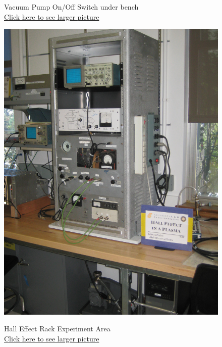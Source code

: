 \documentclass{../lab}
\begin{document}
\begin{figure}[!htb]
  \caption{Vacuum Pump On/Off Switch under bench \\ \href{http://experimentationlab.berkeley.edu/sites/default/files/images/Pump_Switch_3535-Lg.jpg}{Click here to see larger picture}}\label{fig:Pump_Switch_3535-Lg.jpg}
\endminipage\hfill
{}
  \href{http://experimentationlab.berkeley.edu/sites/default/files/images/HAL_3510.jpg}{\includegraphics[width=\linewidth,keepaspectratio]{images/HAL_3510.jpg}}
  \caption{Hall Effect Rack Experiment Area \\ \href{http://experimentationlab.berkeley.edu/sites/default/files/images/HAL_3510.jpg}{Click here to see larger picture}}\label{fig:HAL_Plasma_3510.jpg}
\endminipage\hfill
{}

\end{figure}
\end{document}
